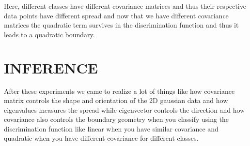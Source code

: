 \documentclass[12pt]{article}
\begin{document}
Here, different classes have different covariance matrices and thus their respective data points have different spread and now that we have different covariance matrices the quadratic term survives in the discrimination function and thus it leads to a quadratic boundary.

\section*{INFERENCE}

After these experiments we came to realize a lot of things like how covariance matrix controls the shape and orientation of the 2D gaussian data and how eigenvalues measures the spread while eigenvector controls the direction and how covariance also controls the boundary geometry when you classify using the discrimination function like linear when you have similar covariance and quadratic when you have different covariance for different classes.
\end{document}
